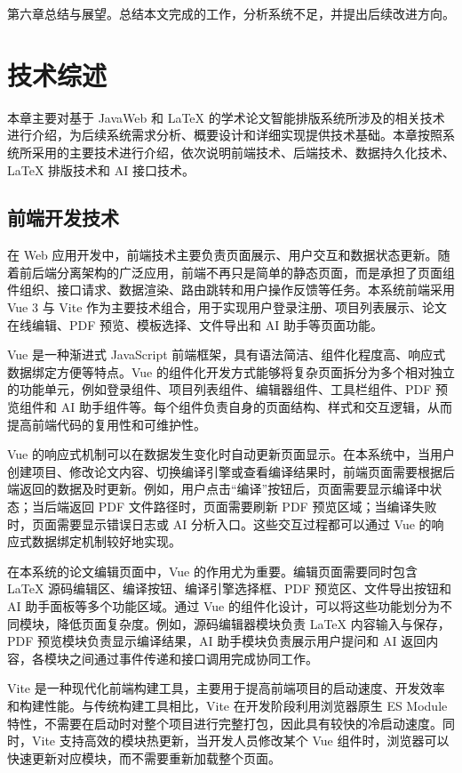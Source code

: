 \documentclass{xduugthesis}
\begin{document}
第六章总结与展望。总结本文完成的工作，分析系统不足，并提出后续改进方向。

\chapter{技术综述}
本章主要对基于 JavaWeb 和 LaTeX 的学术论文智能排版系统所涉及的相关技术进行介绍，为后续系统需求分析、概要设计和详细实现提供技术基础。本章按照系统所采用的主要技术进行介绍，依次说明前端技术、后端技术、数据持久化技术、LaTeX 排版技术和 AI 接口技术。

\section{前端开发技术}
在 Web 应用开发中，前端技术主要负责页面展示、用户交互和数据状态更新。随着前后端分离架构的广泛应用，前端不再只是简单的静态页面，而是承担了页面组件组织、接口请求、数据渲染、路由跳转和用户操作反馈等任务。本系统前端采用 Vue 3 与 Vite 作为主要技术组合，用于实现用户登录注册、项目列表展示、论文在线编辑、PDF 预览、模板选择、文件导出和 AI 助手等页面功能。

Vue 是一种渐进式 JavaScript 前端框架，具有语法简洁、组件化程度高、响应式数据绑定方便等特点\cite{macrae2018vue}。Vue 的组件化开发方式能够将复杂页面拆分为多个相对独立的功能单元，例如登录组件、项目列表组件、编辑器组件、工具栏组件、PDF 预览组件和 AI 助手组件等。每个组件负责自身的页面结构、样式和交互逻辑，从而提高前端代码的复用性和可维护性。

Vue 的响应式机制可以在数据发生变化时自动更新页面显示。在本系统中，当用户创建项目、修改论文内容、切换编译引擎或查看编译结果时，前端页面需要根据后端返回的数据及时更新。例如，用户点击“编译”按钮后，页面需要显示编译中状态；当后端返回 PDF 文件路径时，页面需要刷新 PDF 预览区域；当编译失败时，页面需要显示错误日志或 AI 分析入口。这些交互过程都可以通过 Vue 的响应式数据绑定机制较好地实现。

在本系统的论文编辑页面中，Vue 的作用尤为重要。编辑页面需要同时包含 LaTeX 源码编辑区、编译按钮、编译引擎选择框、PDF 预览区、文件导出按钮和 AI 助手面板等多个功能区域。通过 Vue 的组件化设计，可以将这些功能划分为不同模块，降低页面复杂度。例如，源码编辑器模块负责 LaTeX 内容输入与保存，PDF 预览模块负责显示编译结果，AI 助手模块负责展示用户提问和 AI 返回内容，各模块之间通过事件传递和接口调用完成协同工作。

Vite 是一种现代化前端构建工具，主要用于提高前端项目的启动速度、开发效率和构建性能。与传统构建工具相比，Vite 在开发阶段利用浏览器原生 ES Module 特性，不需要在启动时对整个项目进行完整打包，因此具有较快的冷启动速度。同时，Vite 支持高效的模块热更新，当开发人员修改某个 Vue 组件时，浏览器可以快速更新对应模块，而不需要重新加载整个页面。
\end{document}
